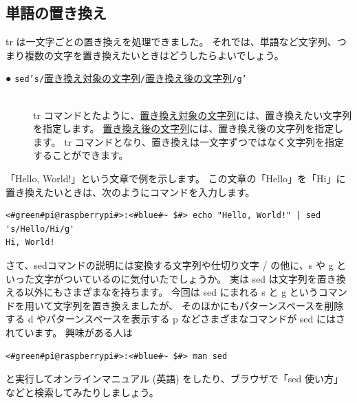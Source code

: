 \documentclass[text03.tex]{subfiles}
\begin{document}
\subsection{単語の置き換え}
tr は一文字ごとの置き換えを処理できました。
それでは、単語など文字列、つまり複数の文字を置き換えたいときはどうしたらよいでしょう。

\begin{description}
    \item[● \texttt{sed}\textvisiblespace\texttt{'s/}\underline{置き換え対象の文字列}\texttt{/}\underline{置き換え後の文字列}\texttt{/g'}]\mbox{}\\
    tr コマンドとたように、\underline{置き換え対象の文字列}には、置き換えたい文字列を指定します。
    \underline{置き換え後の文字列}には、置き換え後の文字列を指定します。
    tr コマンドとなり、置き換えは一文字ずつではなく文字列を指定することができます。
\end{description}

「Hello, World!」という文章で例を示します。
この文章の「Hello」を「Hi」に置き換えたいときは、次のようにコマンドを入力します。
\begin{lstlisting}[caption=sed コマンドを使った例, label=sed_app]
<#green#pi@raspberrypi#>:<#blue#~ $#> echo "Hello, World!" | sed 's/Hello/Hi/g'
Hi, World!
\end{lstlisting}

さて、sedコマンドの説明には変換する文字列や仕切り文字 / の他に、s や g といった文字がついているのに気付いたでしょうか。
実は sed は文字列を置き換える以外にもさまざまなを持ちます。
今回は sed にまれる s と g というコマンドを用いて文字列を置き換えましたが、
そのほかにもパターンスペースを削除する d やパターンスペースを表示する p などさまざまなコマンドが sed にはされています。
興味がある人は
\begin{lstlisting}
<#green#pi@raspberrypi#>:<#blue#~ $#> man sed
\end{lstlisting}
と実行してオンラインマニュアル (英語) をしたり、ブラウザで「sed 使い方」などと検索してみたりしましょう。

\begin{tcolorbox}[title=\useOmetoi]
    \begin{enumerate}
\end{enumerate}
\end{tcolorbox}
\end{document}
